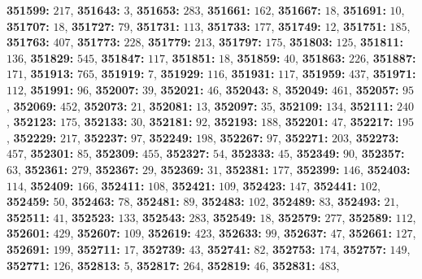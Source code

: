 \textsf{\bfseries 351599:} $217$, \textsf{\bfseries 351643:} $3$, \textsf{\bfseries 351653:} $283$, \textsf{\bfseries 351661:} $162$, \textsf{\bfseries 351667:} $18$, \textsf{\bfseries 351691:} $10$, \textsf{\bfseries 351707:} $18$, \textsf{\bfseries 351727:} $79$, \textsf{\bfseries 351731:} $113$, \textsf{\bfseries 351733:} $177$, \textsf{\bfseries 351749:} $12$, \textsf{\bfseries 351751:} $185$, \textsf{\bfseries 351763:} $407$, \textsf{\bfseries 351773:} $228$, \textsf{\bfseries 351779:} $213$, \textsf{\bfseries 351797:} $175$, \textsf{\bfseries 351803:} $125$, \textsf{\bfseries 351811:} $136$, \textsf{\bfseries 351829:} $545$, \textsf{\bfseries 351847:} $117$, \textsf{\bfseries 351851:} $18$, \textsf{\bfseries 351859:} $40$, \textsf{\bfseries 351863:} $226$, \textsf{\bfseries 351887:} $171$, \textsf{\bfseries 351913:} $765$, \textsf{\bfseries 351919:} $7$, \textsf{\bfseries 351929:} $116$, \textsf{\bfseries 351931:} $117$, \textsf{\bfseries 351959:} $437$, \textsf{\bfseries 351971:} $112$, \textsf{\bfseries 351991:} $96$, \textsf{\bfseries 352007:} $39$, \textsf{\bfseries 352021:} $46$, \textsf{\bfseries 352043:} $8$, \textsf{\bfseries 352049:} $461$, \textsf{\bfseries 352057:} $95$, \textsf{\bfseries 352069:} $452$, \textsf{\bfseries 352073:} $21$, \textsf{\bfseries 352081:} $13$, \textsf{\bfseries 352097:} $35$, \textsf{\bfseries 352109:} $134$, \textsf{\bfseries 352111:} $240$, \textsf{\bfseries 352123:} $175$, \textsf{\bfseries 352133:} $30$, \textsf{\bfseries 352181:} $92$, \textsf{\bfseries 352193:} $188$, \textsf{\bfseries 352201:} $47$, \textsf{\bfseries 352217:} $195$, \textsf{\bfseries 352229:} $217$, \textsf{\bfseries 352237:} $97$, \textsf{\bfseries 352249:} $198$, \textsf{\bfseries 352267:} $97$, \textsf{\bfseries 352271:} $203$, \textsf{\bfseries 352273:} $457$, \textsf{\bfseries 352301:} $85$, \textsf{\bfseries 352309:} $455$, \textsf{\bfseries 352327:} $54$, \textsf{\bfseries 352333:} $45$, \textsf{\bfseries 352349:} $90$, \textsf{\bfseries 352357:} $63$, \textsf{\bfseries 352361:} $279$, \textsf{\bfseries 352367:} $29$, \textsf{\bfseries 352369:} $31$, \textsf{\bfseries 352381:} $177$, \textsf{\bfseries 352399:} $146$, \textsf{\bfseries 352403:} $114$, \textsf{\bfseries 352409:} $166$, \textsf{\bfseries 352411:} $108$, \textsf{\bfseries 352421:} $109$, \textsf{\bfseries 352423:} $147$, \textsf{\bfseries 352441:} $102$, \textsf{\bfseries 352459:} $50$, \textsf{\bfseries 352463:} $78$, \textsf{\bfseries 352481:} $89$, \textsf{\bfseries 352483:} $102$, \textsf{\bfseries 352489:} $83$, \textsf{\bfseries 352493:} $21$, \textsf{\bfseries 352511:} $41$, \textsf{\bfseries 352523:} $133$, \textsf{\bfseries 352543:} $283$, \textsf{\bfseries 352549:} $18$, \textsf{\bfseries 352579:} $277$, \textsf{\bfseries 352589:} $112$, \textsf{\bfseries 352601:} $429$, \textsf{\bfseries 352607:} $109$, \textsf{\bfseries 352619:} $423$, \textsf{\bfseries 352633:} $99$, \textsf{\bfseries 352637:} $47$, \textsf{\bfseries 352661:} $127$, \textsf{\bfseries 352691:} $199$, \textsf{\bfseries 352711:} $17$, \textsf{\bfseries 352739:} $43$, \textsf{\bfseries 352741:} $82$, \textsf{\bfseries 352753:} $174$, \textsf{\bfseries 352757:} $149$, \textsf{\bfseries 352771:} $126$, \textsf{\bfseries 352813:} $5$, \textsf{\bfseries 352817:} $264$, \textsf{\bfseries 352819:} $46$, \textsf{\bfseries 352831:} $483$, 
